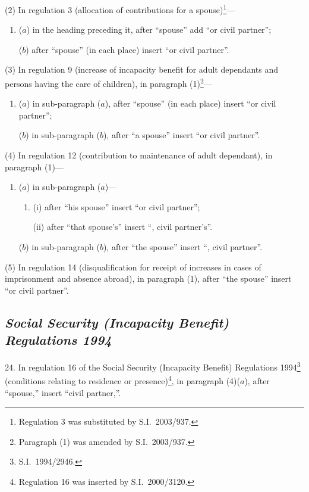 \documentclass[12pt,a4paper]{article}
\begin{document}
(2) In regulation 3 (allocation of contributions for a spouse)\footnote{Regulation 3 was substituted by S.I.\ 2003/937.}—
\begin{enumerate}\item[]
($a$) in the heading preceding it, after “spouse” add “or civil partner”;

($b$) after “spouse” (in each place) insert “or civil partner”.
\end{enumerate}

(3) In regulation 9 (increase of incapacity benefit for adult dependants and persons having the care of children), in paragraph (1)\footnote{Paragraph (1) was amended by S.I.\ 2003/937.}—
\begin{enumerate}\item[]
($a$) in sub-paragraph ($a$), after “spouse” (in each place) insert “or civil partner”;

($b$) in sub-paragraph ($b$), after “a spouse” insert “or civil partner”.
\end{enumerate}

(4) In regulation 12 (contribution to maintenance of adult dependant), in paragraph (1)—
\begin{enumerate}\item[]
($a$) in sub-paragraph ($a$)—
\begin{enumerate}\item[]
(i) after “his spouse” insert “or civil partner”;

(ii) after “that spouse's” insert “, civil partner's”.
\end{enumerate}

($b$) in sub-paragraph ($b$), after “the spouse” insert “, civil partner”.
\end{enumerate}

(5) In regulation 14 (disqualification for receipt of increases in cases of imprisonment and absence abroad), in paragraph (1), after “the spouse” insert “or civil partner”.

\subsection*{\itshape Social Security (Incapacity Benefit) Regulations 1994}

24.  In regulation 16 of the Social Security (Incapacity Benefit) Regulations 1994\footnote{S.I.\ 1994/2946.} (conditions relating to residence or presence)\footnote{Regulation 16 was inserted by S.I.\ 2000/3120.}, in paragraph (4)($a$), after “spouse,” insert “civil partner,”.
\end{document}

